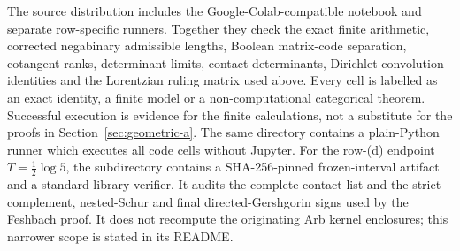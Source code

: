\documentclass[11pt]{amsart}
\theoremstyle{definition}
\theoremstyle{remark}
\begin{document}
The source distribution includes the Google-Colab-compatible notebook
 and separate
row-specific runners.  Together they check the exact finite arithmetic,
corrected negabinary admissible lengths, Boolean matrix-code separation,
cotangent ranks, determinant limits, contact determinants,
Dirichlet-convolution identities and the Lorentzian ruling matrix used above.
Every cell is labelled as an exact identity, a finite model or a
non-computational categorical theorem.  Successful execution is evidence for
the finite calculations, not a substitute for the proofs in
Section~\ref{sec:geometric-a}.  The same directory contains a plain-Python runner
which executes all code cells without Jupyter.
For the row-(d) endpoint \(T=\frac12\log5\), the subdirectory
 contains a SHA-256-pinned frozen-interval
artifact and a standard-library verifier.  It audits the complete contact
list and the strict complement, nested-Schur and final directed-Gershgorin
signs used by the Feshbach proof.  It does not recompute the originating Arb
kernel enclosures; this narrower scope is stated in its README.
\end{document}
